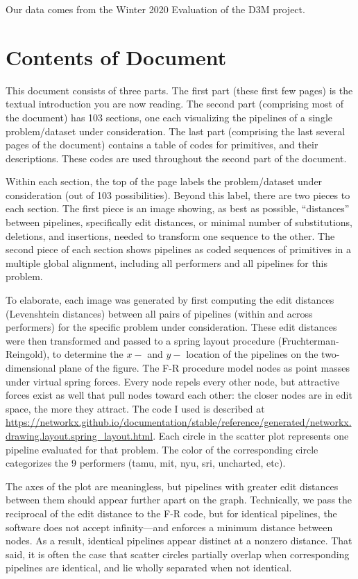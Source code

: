 \documentclass{article}
\begin{document}
Our data comes from the Winter 2020 Evaluation of the D3M project.

\section{Contents of Document}

This document consists of three parts.  The first part (these first
few pages) is the textual introduction you are now reading.  The
second part (comprising most of the document) has 103 sections, one
each visualizing the pipelines of a single problem/dataset under
consideration.  The last part (comprising the last several pages of
the document) contains a table of codes for primitives, and their
descriptions.  These codes are used throughout the second part of the
document.

Within each section, the top of the page labels the problem/dataset
under consideration (out of 103 possibilities).  Beyond this label,
there are two pieces to each section.  The first piece is an image
showing, as best as possible, ``distances'' between pipelines,
specifically edit distances, or minimal number of substitutions,
deletions, and insertions, needed to transform one sequence to the
other.  The second piece of each section shows pipelines as coded
sequences of primitives in a multiple global alignment, including all
performers and all pipelines for this problem.

To elaborate, each image was generated by first computing the edit
distances (Levenshtein distances) between all pairs of pipelines
(within and across performers) for the specific problem under
consideration.  These edit distances were then transformed and passed
to a spring layout procedure (Fruchterman-Reingold), to determine the
$x-$ and $y-$ location of the pipelines on the two-dimensional plane
of the figure.  The F-R procedure model nodes as point masses under
virtual spring forces.  Every node repels every other node, but
attractive forces exist as well that pull nodes toward each other: the
closer nodes are in edit space, the more they attract.  The code I
used is described at
\url{https://networkx.github.io/documentation/stable/reference/generated/networkx.drawing.layout.spring_layout.html}{}.
Each circle in the scatter plot represents one pipeline evaluated for
that problem.  The color of the corresponding circle categorizes the 9
performers (tamu, mit, nyu, sri, uncharted, etc).

The axes of the plot are meaningless, but pipelines with greater edit
distances between them should appear further apart on the graph.
Technically, we pass the reciprocal of the edit distance to the F-R
code, but for identical pipelines, the software does not accept
infinity---and enforces a minimum distance between nodes.  As a
result, identical pipelines appear distinct at a nonzero distance.
That said, it is often the case that scatter circles partially overlap
when corresponding pipelines are identical, and lie wholly separated
when not identical.
\end{document}
